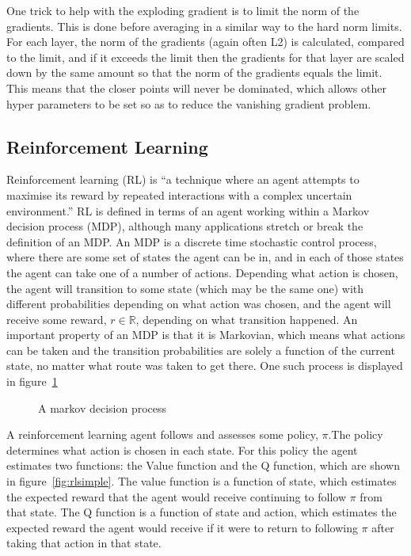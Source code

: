One trick to help with the exploding gradient is to limit the norm of the gradients. This is done before averaging in a similar way to the hard norm limits. For each layer, the norm of the gradients (again often L2) is calculated, compared to the limit, and if it exceeds the limit then the gradients for that layer are scaled down by the same amount so that the norm of the gradients equals the limit. This means that the closer points will never be dominated, which allows other hyper parameters to be set so as to reduce the vanishing gradient problem.

\subsection{Reinforcement Learning}

Reinforcement learning (RL) is ``a technique where an agent attempts to maximise its reward by repeated interactions with a complex uncertain environment.'' \cite{Sutton:1998:IRL:551283}
RL is defined in terms of an agent working within a Markov decision process (MDP), although many applications stretch or break the definition of an MDP. An MDP is a discrete time stochastic control process, where there are some set of states the agent can be in, and in each of those states the agent can take one of a number of actions. Depending what action is chosen, the agent will transition to some state (which may be the same one) with different probabilities depending on what action was chosen, and the agent will receive some reward, $r \in \mathbb{R}$, depending on what transition happened. An important property of an MDP is that it is Markovian, which means what actions can be taken and the transition probabilities are solely a function of the current state, no matter what route was taken to get there. One such process is displayed in figure~\ref{fig:mdpsimple}

\begin{figure}
\centering

\caption{A markov decision process}
\label{fig:mdpsimple}
\end{figure}

A reinforcement learning agent follows and assesses some policy, $\pi$.The policy determines what action is chosen in each state. For this policy the agent estimates two functions: the Value function and the Q function, which are shown in figure~\ref{fig:rlsimple}.  The value function is a function of state, which estimates the expected reward that the agent would receive continuing to follow $\pi$ from that state. The Q function is a function of state and action, which estimates  the expected reward the agent would receive if it were to return to following $\pi$ after taking that action in that state.


